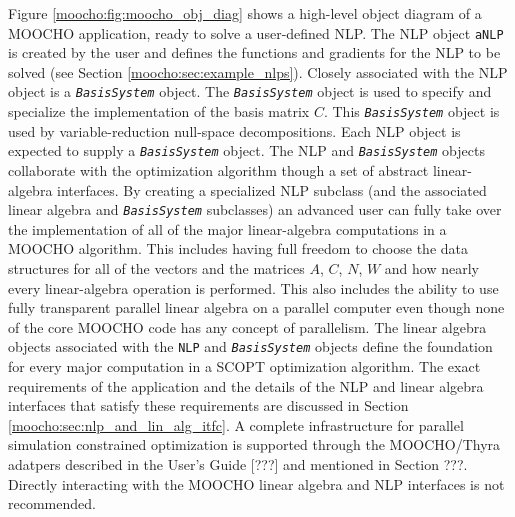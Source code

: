 \documentclass[pdf,ps2pdf,11pt]{SANDreport}
\begin{document}
Figure {}\ref{moocho:fig:moocho_obj_diag} shows a high-level object diagram of a
MOOCHO application, ready to solve a user-defined NLP.  The NLP object
{}\texttt{aNLP} is created by the user and defines the functions and gradients
for the NLP to be solved (see Section {}\ref{moocho:sec:example_nlps}).
Closely associated with the NLP object is a {}\texttt{\textit{BasisSystem}}
object.  The {}\texttt{\textit{BasisSystem}} object is used to specify and
specialize the implementation of the basis matrix $C$.  This
{}\texttt{\textit{BasisSystem}} object is used by variable-reduction
null-space decompositions.  Each NLP object is expected to supply a
{}\texttt{\textit{BasisSystem}} object.  The NLP and
{}\texttt{\textit{BasisSystem}} objects collaborate with the optimization
algorithm though a set of abstract linear-algebra interfaces.  By creating a
specialized NLP subclass (and the associated linear algebra and
{}\texttt{\textit{BasisSystem}} subclasses) an advanced user can fully take
over the implementation of all of the major linear-algebra computations in a
MOOCHO algorithm.  This includes having full freedom to choose the data
structures for all of the vectors and the matrices $A$, $C$, $N$, $W$ and how
nearly every linear-algebra operation is performed.  This also includes the
ability to use fully transparent parallel linear algebra on a parallel
computer even though none of the core MOOCHO code has any concept of
parallelism.  The linear algebra objects associated with the
{}\texttt{\texttt{NLP}} and {}\texttt{\textit{Basis\-System}} objects define
the foundation for every major computation in a SCOPT optimization algorithm.
The exact requirements of the application and the details of the NLP and
linear algebra interfaces that satisfy these requirements are discussed in
Section {}\ref{moocho:sec:nlp_and_lin_alg_itfc}.  A complete infrastructure
for parallel simulation constrained optimization is supported through the
MOOCHO/Thyra adatpers described in the User's Guide [???] and mentioned in
Section ???.  Directly interacting with the MOOCHO linear algebra and NLP
interfaces is not recommended.
\end{document}
